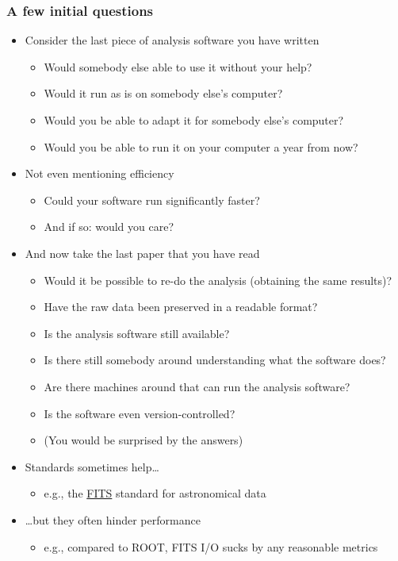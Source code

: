 \documentclass[9pt]{beamer}
\begin{document}
\begin{frame}
  \frametitle{A few initial questions}
  \begin{itemize}
  \item Consider the last piece of analysis software you have written
    \begin{itemize}
    \item Would somebody else able to use it without your help?
    \item Would it run as is on somebody else's computer?
    \item Would you be able to adapt it for somebody else's computer?
    \item Would you be able to run it on your computer a year from now?
    \end{itemize}
  \item Not even mentioning efficiency
    \begin{itemize}
    \item Could your software run significantly faster?
    \item And if so: would you care?
    \end{itemize}
  \item And now take the last paper that you have read
    \begin{itemize}
    \item Would it be possible to re-do the analysis (obtaining the same
      results)?
    \item Have the raw data been preserved in a readable format?
    \item Is the analysis software still available?
    \item Is there still somebody around understanding what the software does?
    \item Are there machines around that can run the analysis software?
    \item Is the software even version-controlled?
    \item \alert{(You would be surprised by the answers)}
    \end{itemize}
  \item Standards sometimes help\ldots
    \begin{itemize}
    \item e.g., the \href{https://fits.gsfc.nasa.gov/fits\_standard.html}{FITS}
      standard for astronomical data
    \end{itemize}
  \item \ldots but they often hinder performance
    \begin{itemize}
    \item e.g., compared to ROOT, FITS I/O sucks by any reasonable metrics
    \end{itemize}
  \end{itemize}
\end{frame}
\end{document}
